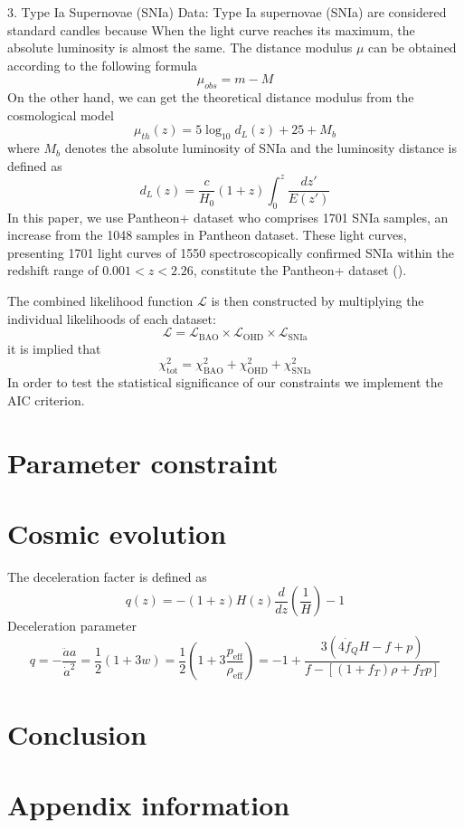 \documentclass[manuscript]{aastex631}
\begin{document}
3. Type Ia Supernovae (SNIa) Data: Type Ia supernovae (SNIa) are considered standard candles because When the light curve reaches its maximum, the absolute luminosity is almost the same. The distance modulus $\mu$ can be obtained according to the following formula
\begin{equation}
    \mu_{obs}=m-M
\end{equation}
On the other hand, we can get the theoretical distance modulus from the cosmological model
\begin{equation}
    \mu_{th}(z)=5\log_{10}d_L(z)+25+M_b
\end{equation}
where $M_b$ denotes the absolute luminosity of SNIa and the luminosity distance is defined as
\begin{equation}
    d_L(z)=\frac{c}{H_0}(1+z)\int_0^z \frac{dz'}{E(z')}
\end{equation}
In this paper, we use Pantheon+ dataset who comprises 1701 SNIa samples, an increase from the 1048 samples in Pantheon dataset. These light curves, presenting 1701 light curves of 1550 spectroscopically confirmed SNIa within the redshift range of $0.001 < z < 2.26$, constitute the Pantheon+ dataset (\cite{Scolnic_2022,Brout_2022}).

The combined likelihood function \(\mathcal{L}\) is then constructed by multiplying the individual likelihoods of each dataset:
\begin{equation}
\mathcal{L} = \mathcal{L}_{\text{BAO}} \times \mathcal{L}_{\text{OHD}} \times \mathcal{L}_{\text{SNIa}}
\end{equation}
it is implied that
\begin{equation}
    \chi^2_\text{tot}=\chi^2_{\text{BAO}}+\chi^2_{\text{OHD}} +\chi^2_{\text{SNIa}}
\end{equation}
In order to test the statistical significance of our constraints we implement the AIC criterion.





\section{Parameter constraint }

\section{Cosmic evolution}
The deceleration facter is defined as
\begin{equation}
    q(z)=-(1+z)H(z)\frac{d}{dz}\left(\frac{1}{H}\right)-1 
\end{equation}
Deceleration parameter
\begin{equation}
    q=-\frac{\ddot{a}a}{\dot{a}^2}=\frac{1}{2}(1+3w)=\frac{1}{2}\left(1+3\frac{p_{\text{eff}}}{\rho_{\text{eff}}}\right)=-1+\frac{3(4\dot{f}_QH-f+p)}{f-[(1+f_T)\rho+f_Tp]}
\end{equation}
\section{Conclusion}
\appendix

\section{Appendix information}



{}

\end{document}
